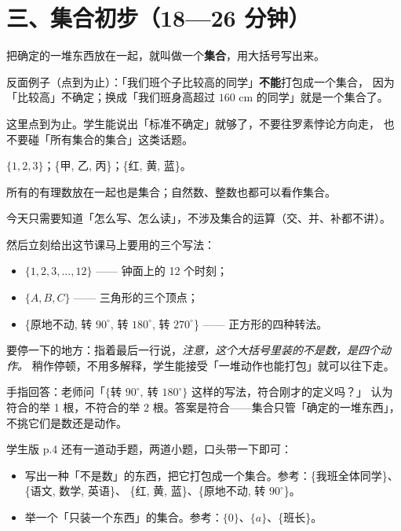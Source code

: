 \section*{三、集合初步（18—26 分钟）}

\begin{definition}[集合]
  把确定的一堆东西放在一起，就叫做一个\textbf{集合}，用大括号写出来。
\end{definition}

\noindent 反面例子（点到为止）：「我们班个子比较高的同学」\textbf{不能}打包成一个集合，
因为「比较高」不确定；换成「我们班身高超过 \(160\) cm 的同学」就是一个集合了。

\begin{zhu}
  这里点到为止。学生能说出「标准不确定」就够了，不要往罗素悖论方向走，
  也不要碰「所有集合的集合」这类话题。
\end{zhu}

\begin{example}
  \(\{1,2,3\}\)；\quad \{甲, 乙, 丙\}；\quad \{红, 黄, 蓝\}。

  所有的有理数放在一起也是集合；自然数、整数也都可以看作集合。
\end{example}

\begin{zhu}
  今天只需要知道「怎么写、怎么读」，不涉及集合的运算（交、并、补都不讲）。
\end{zhu}

然后立刻给出这节课马上要用的三个写法：

\begin{itemize}
  \item \(\{1,2,3,\dots,12\}\) —— 钟面上的 12 个时刻；
  \item \(\{A,B,C\}\) —— 三角形的三个顶点；
  \item \{原地不动, 转 \(90^\circ\), 转 \(180^\circ\), 转 \(270^\circ\)\} —— 正方形的四种转法。
\end{itemize}

要停一下的地方：指着最后一行说，\emph{注意，这个大括号里装的不是数，是四个动作。}
稍作停顿，不用多解释，学生能接受「一堆动作也能打包」就可以往下走。

\noindent 手指回答：老师问「\(\{\text{转 }90^\circ,\ \text{转 }180^\circ\}\) 这样的写法，符合刚才的定义吗？」
认为符合的举 1 根，不符合的举 2 根。答案是符合——集合只管「确定的一堆东西」，不挑它们是数还是动作。

\noindent 学生版 p.4 还有一道动手题，两道小题，口头带一下即可：

\begin{itemize}
  \item 写出一种「不是数」的东西，把它打包成一个集合。参考：\{我班全体同学\}、\{语文, 数学, 英语\}、
    \{红, 黄, 蓝\}、\{原地不动, 转 \(90^\circ\)\}。
  \item 举一个「只装一个东西」的集合。参考：\(\{0\}\)、\(\{a\}\)、\{班长\}。
\end{itemize}

